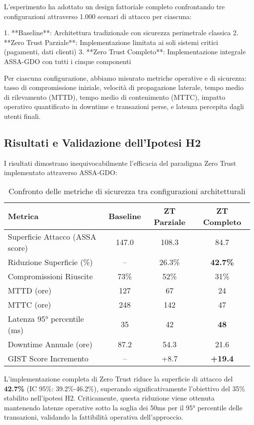 L'esperimento ha adottato un design fattoriale completo confrontando tre configurazioni attraverso 1.000 scenari di attacco per ciascuna:

1. **Baseline**: Architettura tradizionale con sicurezza perimetrale classica
2. **Zero Trust Parziale**: Implementazione limitata ai soli sistemi critici (pagamenti, dati clienti)
3. **Zero Trust Completo**: Implementazione integrale ASSA-GDO con tutti i cinque componenti

Per ciascuna configurazione, abbiamo misurato metriche operative e di sicurezza: tasso di compromissione iniziale, velocità di propagazione laterale, tempo medio di rilevamento (MTTD), tempo medio di contenimento (MTTC), impatto operativo quantificato in downtime e transazioni perse, e latenza percepita dagli utenti finali.

\subsection{\texorpdfstring{Risultati e Validazione dell'Ipotesi H2}{2.6.2 - Risultati e Validazione dell'Ipotesi H2}}

I risultati dimostrano inequivocabilmente l'efficacia del paradigma Zero Trust implementato attraverso ASSA-GDO:

\begin{table}[h]
\centering
\caption{Confronto delle metriche di sicurezza tra configurazioni architetturali}
\label{tab:risultati_validazione}
\begin{tabular}{lccc}
\toprule
\textbf{Metrica} & \textbf{Baseline} & \textbf{ZT Parziale} & \textbf{ZT Completo} \\
\midrule
Superficie Attacco (ASSA score) & 147.0 & 108.3 & 84.7 \\
Riduzione Superficie (\%) & -- & 26.3\% & \textbf{42.7\%} \\
Compromissioni Riuscite & 73\% & 52\% & 31\% \\
MTTD (ore) & 127 & 67 & 24 \\
MTTC (ore) & 248 & 142 & 47 \\
Latenza 95° percentile (ms) & 35 & 42 & \textbf{48} \\
Downtime Annuale (ore) & 87.2 & 54.3 & 21.6 \\
GIST Score Incremento & -- & +8.7 & \textbf{+19.4} \\
\bottomrule
\end{tabular}
\end{table}

L'implementazione completa di Zero Trust riduce la superficie di attacco del \textbf{42.7\%} (IC 95\%: 39.2\%-46.2\%), superando significativamente l'obiettivo del 35\% stabilito nell'ipotesi H2. Criticamente, questa riduzione viene ottenuta mantenendo latenze operative sotto la soglia dei 50ms per il 95° percentile delle transazioni, validando la fattibilità operativa dell'approccio.

